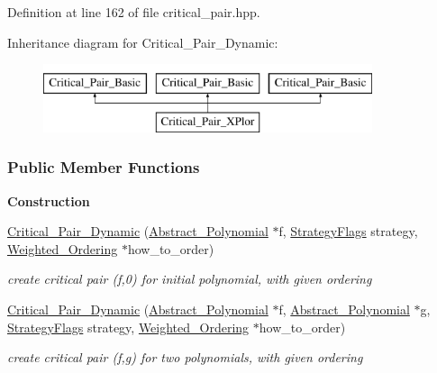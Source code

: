 Definition at line 162 of file critical\+\_\+pair.\+hpp.

Inheritance diagram for Critical\+\_\+\+Pair\+\_\+\+Dynamic\+:\begin{figure}[H]
\begin{center}
\leavevmode
\includegraphics[height=2.000000cm]{group___g_b_computation}
\end{center}
\end{figure}
\subsubsection*{Public Member Functions}
\begin{Indent}\textbf{ Construction}\par
\begin{DoxyCompactItemize}
\item 
\mbox{\label{group___g_b_computation_a121415e702ea63da6444839d9f59669a}} 
\hyperlink{group___g_b_computation_a121415e702ea63da6444839d9f59669a}{Critical\+\_\+\+Pair\+\_\+\+Dynamic} (\hyperlink{group__polygroup_class_abstract___polynomial}{Abstract\+\_\+\+Polynomial} $\ast$f, \hyperlink{group__strategygroup_ga0ee6c8e033547330e6b89929730007f4}{Strategy\+Flags} strategy, \hyperlink{group__orderinggroup_class_weighted___ordering}{Weighted\+\_\+\+Ordering} $\ast$how\+\_\+to\+\_\+order)
\begin{DoxyCompactList}\small\item\em create critical pair (f,0) for initial polynomial, with given ordering \end{DoxyCompactList}\item 
\mbox{\label{group___g_b_computation_afe29c049d24e98470ba7099d25a01b15}} 
\hyperlink{group___g_b_computation_afe29c049d24e98470ba7099d25a01b15}{Critical\+\_\+\+Pair\+\_\+\+Dynamic} (\hyperlink{group__polygroup_class_abstract___polynomial}{Abstract\+\_\+\+Polynomial} $\ast$f, \hyperlink{group__polygroup_class_abstract___polynomial}{Abstract\+\_\+\+Polynomial} $\ast$g, \hyperlink{group__strategygroup_ga0ee6c8e033547330e6b89929730007f4}{Strategy\+Flags} strategy, \hyperlink{group__orderinggroup_class_weighted___ordering}{Weighted\+\_\+\+Ordering} $\ast$how\+\_\+to\+\_\+order)
\begin{DoxyCompactList}\small\item\em create critical pair (f,g) for two polynomials, with given ordering \end{DoxyCompactList}\end{DoxyCompactItemize}
\end{Indent}
